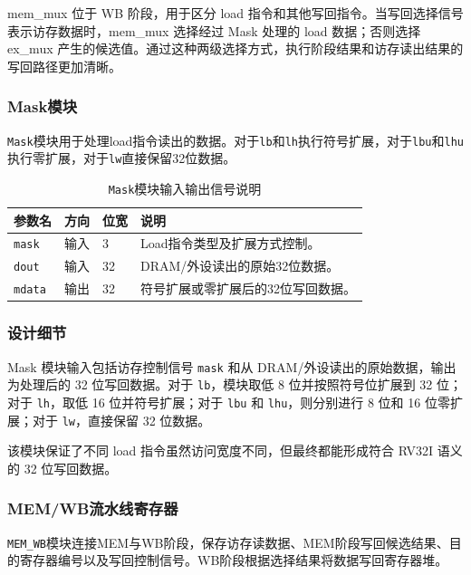 \documentclass[12pt,a4paper]{ctexart}
\newcommand{\code}[1]{\texttt{#1}}
\begin{document}
mem\_mux 位于 WB 阶段，用于区分 load 指令和其他写回指令。当写回选择信号表示访存数据时，mem\_mux 选择经过 Mask 处理的 load 数据；否则选择 ex\_mux 产生的候选值。通过这种两级选择方式，执行阶段结果和访存读出结果的写回路径更加清晰。

\subsubsection{Mask模块}

\code{Mask}模块用于处理load指令读出的数据。对于\code{lb}和\code{lh}执行符号扩展，对于\code{lbu}和\code{lhu}执行零扩展，对于\code{lw}直接保留32位数据。

\begin{table}[H]
\centering
\caption{\code{Mask}模块输入输出信号说明}
\footnotesize
\renewcommand{\arraystretch}{1.15}
\begin{tabularx}{\textwidth}{p{3.2cm}p{1.5cm}p{2.1cm}X}
\toprule
参数名 & 方向 & 位宽 & 说明 \\
\midrule
\code{mask} & 输入 & 3 & Load指令类型及扩展方式控制。 \\
\code{dout} & 输入 & 32 & DRAM/外设读出的原始32位数据。 \\
\code{mdata} & 输出 & 32 & 符号扩展或零扩展后的32位写回数据。 \\
\bottomrule
\end{tabularx}
\end{table}

\subsubsection*{设计细节}

Mask 模块输入包括访存控制信号 \code{mask} 和从 DRAM/外设读出的原始数据，输出为处理后的 32 位写回数据。对于 \code{lb}，模块取低 8 位并按照符号位扩展到 32 位；对于 \code{lh}，取低 16 位并符号扩展；对于 \code{lbu} 和 \code{lhu}，则分别进行 8 位和 16 位零扩展；对于 \code{lw}，直接保留 32 位数据。

该模块保证了不同 load 指令虽然访问宽度不同，但最终都能形成符合 RV32I 语义的 32 位写回数据。

\subsubsection{MEM/WB流水线寄存器}

\code{MEM\_WB}模块连接MEM与WB阶段，保存访存读数据、MEM阶段写回候选结果、目的寄存器编号以及写回控制信号。WB阶段根据选择结果将数据写回寄存器堆。
\end{document}
